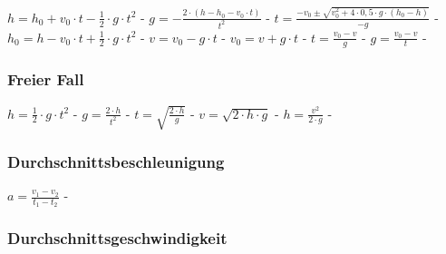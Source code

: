$ h = h_{0}  + v_{0} \cdot t - \frac{1}{2}\cdot g\cdot t^{2} $ - $ g = - \frac{2\cdot (h - h_{0}  - v_{0} \cdot t)}{     t^{2} } $ - $ t = \frac{-v_{0}  \pm \sqrt{v_{0} ^{2} +4\cdot 0,5\cdot g\cdot (h_{0}  -h)}}{      -g} $ - $ h_{0}  = h - v_{0} \cdot t + \frac{1}{2}\cdot g\cdot t^{2} $ - $ v = v_{0}  - g\cdot t $ - $ v_{0}  = v + g\cdot t $ - $ t = \frac{v_{0} -v}{  g} $ - $ g = \frac{v_{0}  - v}{  t} $ - \\ 
 
\subsubsection{Freier Fall} 
\begin{minipage}{0.45\textwidth} 
\end{minipage} 
\begin{minipage}{0.45\textwidth} 
 
\legende{}\end{minipage} 
 
$ h = \frac{1}{2}\cdot g\cdot t^{2} $ - $ g = \frac{2\cdot h}{ t^{2} } $ - $ t = \sqrt{\frac{2\cdot h}{g}} $ - $ v = \sqrt{2\cdot h\cdot g} $ - $ h = \frac{ v^{2} }{2\cdot g} $ - \\ 
 
\subsubsection{Durchschnittsbeschleunigung} 
\begin{minipage}{0.45\textwidth} 
\end{minipage} 
\begin{minipage}{0.45\textwidth} 
 
\legende{}\end{minipage} 
 
$ a = \frac{v_{1}  - v_{2} }{t_{1}  - t_{2} } $ - \\ 
 
\subsubsection{Durchschnittsgeschwindigkeit} 
\begin{minipage}{0.45\textwidth} 
\end{minipage} 
\begin{minipage}{0.45\textwidth} 
 
\legende{}\end{minipage} 
 
